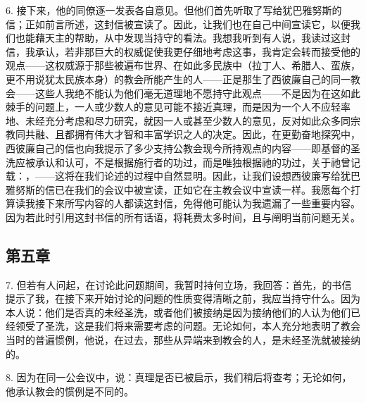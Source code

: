 6. 接下来，他的同僚逐一发表各自意见。但他们首先听取了写给犹巴雅努斯的信；正如前言所述，这封信被宣读了。因此，让我们也在自己中间宣读它，以便我们也能藉天主的帮助，从中发现当持守的看法。我想我听到有人说，我读过这封信，我承认，若非那巨大的权威促使我更仔细地考虑这事，我肯定会转而接受他的观点——这权威源于那些被遍布世界、在如此多民族中（拉丁人、希腊人、蛮族，更不用说犹太民族本身）的教会所能产生的人——正是那生了西彼廉自己的同一教会——这些人我绝不能认为他们毫无道理地不愿持守此观点——不是因为在这如此棘手的问题上，一人或少数人的意见可能不接近真理，而是因为一个人不应轻率地、未经充分考虑和尽力研究，就因一人或甚至少数人的意见，反对如此众多同宗教同共融、且都拥有伟大才智和丰富学识之人的决定。因此，在更勤奋地探究中，西彼廉自己的信也向我提示了多少支持公教会现今所持观点的内容——即基督的圣洗应被承认和认可，不是根据施行者的功过，而是唯独根据祂的功过，关于祂曾记载：，——这将在我们论述的过程中自然显明。因此，让我们设想西彼廉写给犹巴雅努斯的信已在我们的会议中被宣读，正如它在主教会议中宣读一样。我愿每个打算读我接下来所写内容的人都读这封信，免得他可能认为我遗漏了一些重要内容。因为若此时引用这封书信的所有话语，将耗费太多时间，且与阐明当前问题无关。\par


\subsection{第五章}

7. 但若有人问起，在讨论此问题期间，我暂时持何立场，我回答：首先，的书信提示了我，在接下来开始讨论的问题的性质变得清晰之前，我应当持守什么。因为本人说：他们是否真的未经圣洗，或者他们被接纳是因为接纳他们的人认为他们已经领受了圣洗，这是我们将来需要考虑的问题。无论如何，本人充分地表明了教会当时的普遍惯例，他说，在过去，那些从异端来到教会的人，是未经圣洗就被接纳的。\par

8. 因为在同一公会议中，说：真理是否已被启示，我们稍后将查考；无论如何，他承认教会的惯例是不同的。\par

